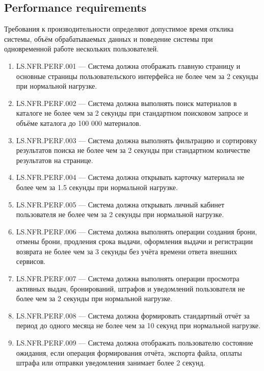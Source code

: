 \documentclass[12pt,a4paper]{article}
\begin{document}
	\subsection{Performance requirements}
	
	Требования к производительности определяют допустимое время отклика системы,
	объём обрабатываемых данных и поведение системы при одновременной работе
	нескольких пользователей.
	
	\begin{enumerate}
		\item LS.NFR.PERF.001 --- Система должна отображать главную страницу и основные
		страницы пользовательского интерфейса не более чем за 2 секунды при нормальной
		нагрузке.
		
		\item LS.NFR.PERF.002 --- Система должна выполнять поиск материалов в каталоге
		не более чем за 2 секунды при стандартном поисковом запросе и объёме каталога
		до 100 000 материалов.
		
		\item LS.NFR.PERF.003 --- Система должна выполнять фильтрацию и сортировку
		результатов поиска не более чем за 2 секунды при стандартном количестве
		результатов на странице.
		
		\item LS.NFR.PERF.004 --- Система должна открывать карточку материала не более
		чем за 1.5 секунды при нормальной нагрузке.
		
		\item LS.NFR.PERF.005 --- Система должна открывать личный кабинет пользователя
		не более чем за 2 секунды при нормальной нагрузке.
		
		\item LS.NFR.PERF.006 --- Система должна выполнять операции создания брони,
		отмены брони, продления срока выдачи, оформления выдачи и регистрации возврата
		не более чем за 3 секунды без учёта времени ответа внешних сервисов.
		
		\item LS.NFR.PERF.007 --- Система должна выполнять операции просмотра активных
		выдач, бронирований, штрафов и уведомлений пользователя не более чем за
		2 секунды при нормальной нагрузке.
		
		\item LS.NFR.PERF.008 --- Система должна формировать стандартный отчёт за период
		до одного месяца не более чем за 10 секунд при нормальной нагрузке.
		
		\item LS.NFR.PERF.009 --- Система должна отображать пользователю состояние
		ожидания, если операция формирования отчёта, экспорта файла, оплаты штрафа
		или отправки уведомления занимает более 2 секунд.
		

\end{enumerate}
\end{document}
